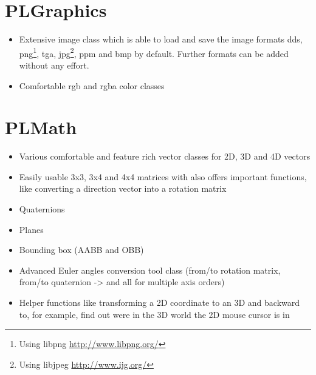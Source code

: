 \section{PLGraphics}
\begin{itemize}
\item{Extensive image class which is able to load and save the image formats dds, png\footnote{Using libpng \url{http://www.libpng.org/}}, tga, jpg\footnote{Using libjpeg \url{http://www.ijg.org/}}, ppm and bmp by default. Further formats can be added without any effort.}
\item{Comfortable rgb and rgba color classes}
\end{itemize}




\section{PLMath}
\begin{itemize}
\item{Various comfortable and feature rich vector classes for 2D, 3D and 4D vectors}
\item{Easily usable 3x3, 3x4 and 4x4 matrices with also offers important functions, like converting a direction vector into a rotation matrix}
\item{Quaternions}
\item{Planes}
\item{Bounding box (AABB and OBB)}
\item{Advanced Euler angles conversion tool class (from/to rotation matrix, from/to quaternion -> and all for multiple axis orders)}
\item{Helper functions like transforming a 2D coordinate to an 3D and backward to, for example, find out were in the 3D world the 2D mouse cursor is in}
\end{itemize}
